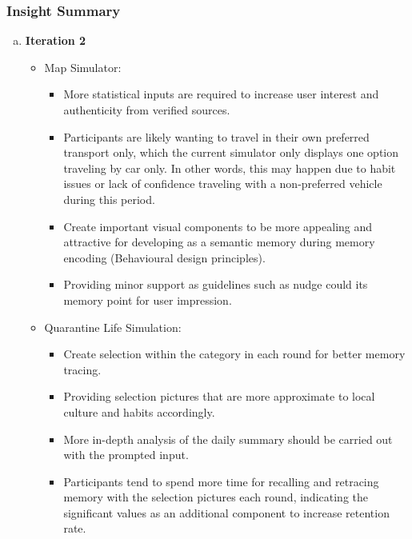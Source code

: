     \subsubsection{Insight Summary}
      \begin{enumerate}[a)]
        \item \textbf{Iteration 2}
        \begin{itemize}
          \item Map Simulator:
            \begin{itemize}
              \item More statistical inputs are required to increase user interest and authenticity from verified sources. 
              \item Participants are likely wanting to travel in their own preferred transport only, which the current simulator only displays one option traveling by car only. In other words, this may happen due to habit issues or lack of confidence traveling with a non-preferred vehicle during this period.
              \item Create important visual components to be more appealing and attractive for developing as a semantic memory during memory encoding (Behavioural design principles).
              \item Providing minor support as guidelines such as nudge could its memory point for user impression.
            \end{itemize}
          \item Quarantine Life Simulation:
            \begin{itemize}
              \item Create selection within the category in each round for better memory tracing.
              \item Providing selection pictures that are more approximate to local culture and habits accordingly.
              \item More in-depth analysis of the daily summary should be carried out with the prompted input.
              \item Participants tend to spend more time for recalling and retracing memory with the selection pictures each round, indicating the significant values as an additional component to increase retention rate.
            \end{itemize}
        \end{itemize}
      \end{enumerate}